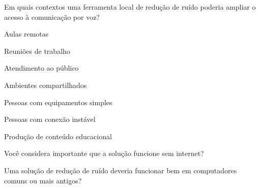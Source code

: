\begin{perguntaFormulario}{Em quais contextos uma ferramenta local de redução de ruído poderia ampliar o acesso à comunicação por voz?}
\begin{opcoesFormularioDuasColunas}
    \item Aulas remotas
    \item Reuniões de trabalho
    \item Atendimento ao público
    \item Ambientes compartilhados
    \item Pessoas com equipamentos simples
    \item Pessoas com conexão instável
    \item Produção de conteúdo educacional
\end{opcoesFormularioDuasColunas}
\end{perguntaFormulario}


\begin{perguntaFormulario}{Você considera importante que a solução funcione sem internet?}
\end{perguntaFormulario}

\begin{perguntaFormulario}{Uma solução de redução de ruído deveria funcionar bem em computadores comuns ou mais antigos?}
\end{perguntaFormulario}


